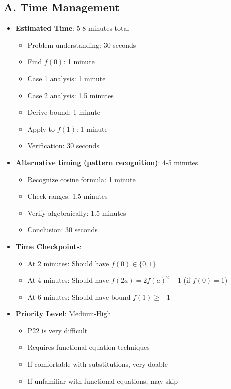 \documentclass[12pt]{article}
\begin{document}
\begin{competitionbox}
\subsection*{A. Time Management}
\begin{itemize}[leftmargin=*]
    \item \textbf{Estimated Time}: 5-8 minutes total
    \begin{itemize}
        \item Problem understanding: 30 seconds
        \item Find $f(0)$: 1 minute
        \item Case 1 analysis: 1 minute
        \item Case 2 analysis: 1.5 minutes
        \item Derive bound: 1 minute
        \item Apply to $f(1)$: 1 minute
        \item Verification: 30 seconds
    \end{itemize}
    \item \textbf{Alternative timing (pattern recognition)}: 4-5 minutes
    \begin{itemize}
        \item Recognize cosine formula: 1 minute
        \item Check ranges: 1.5 minutes
        \item Verify algebraically: 1.5 minutes
        \item Conclusion: 30 seconds
    \end{itemize}
    \item \textbf{Time Checkpoints}: 
    \begin{itemize}
        \item At 2 minutes: Should have $f(0) \in \{0, 1\}$
        \item At 4 minutes: Should have $f(2a) = 2f(a)^2 - 1$ (if $f(0) = 1$)
        \item At 6 minutes: Should have bound $f(1) \geq -1$
    \end{itemize}
    \item \textbf{Priority Level}: Medium-High
    \begin{itemize}
        \item P22 is very difficult
        \item Requires functional equation techniques
        \item If comfortable with substitutions, very doable
        \item If unfamiliar with functional equations, may skip
    \end{itemize}
\end{itemize}


\end{competitionbox}
\end{document}
